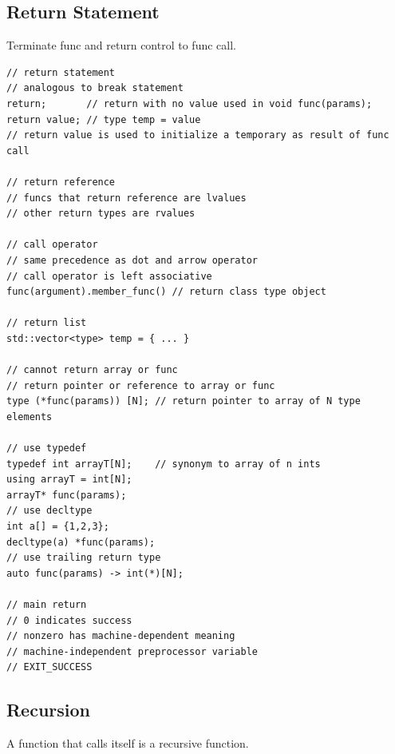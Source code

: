 \documentclass{blog}
\begin{document}
\subsection{Return Statement}
\begin{definition}[return]
    Terminate func and return control to func call.
    \begin{verbatim}
// return statement
// analogous to break statement
return;       // return with no value used in void func(params);
return value; // type temp = value
// return value is used to initialize a temporary as result of func call

// return reference
// funcs that return reference are lvalues
// other return types are rvalues

// call operator
// same precedence as dot and arrow operator
// call operator is left associative
func(argument).member_func() // return class type object

// return list
std::vector<type> temp = { ... }

// cannot return array or func
// return pointer or reference to array or func
type (*func(params)) [N]; // return pointer to array of N type elements

// use typedef
typedef int arrayT[N];    // synonym to array of n ints
using arrayT = int[N];
arrayT* func(params);
// use decltype
int a[] = {1,2,3};
decltype(a) *func(params);
// use trailing return type
auto func(params) -> int(*)[N];

// main return
// 0 indicates success
// nonzero has machine-dependent meaning
// machine-independent preprocessor variable
// EXIT_SUCCESS
\end{verbatim}
\end{definition}

\subsection{Recursion}
\begin{definition}[recursion]
    A function that calls itself is a recursive function.
\end{definition}
\end{document}
